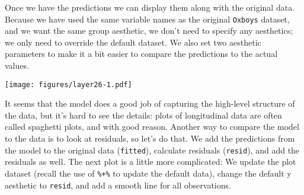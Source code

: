 \begin{Shaded}
\begin{Highlighting}[]
\NormalTok{>}\StringTok{ }\StringTok{ }\NormalTok{(-}\NormalTok{, }\NormalTok{, } \NormalTok{)}
\NormalTok{>}\StringTok{ }\StringTok{ }
\NormalTok{>}\StringTok{ }
\ErrorTok{>}\StringTok{ }\StringTok{ }\NormalTok{(}  
\NormalTok{>}\StringTok{ }\StringTok{ }
\end{Highlighting}
\end{Shaded}

Once we have the predictions we can display them along with the original
data. Because we have used the same variable names as the original
\texttt{Oxboys} dataset, and we want the same group aesthetic, we don't
need to specify any aesthetics; we only need to override the default
dataset. We also set two aesthetic parameters to make it a bit easier to
compare the predictions to the actual values.

\begin{Shaded}
\begin{Highlighting}[]
\NormalTok{>}\StringTok{ }\StringTok{ }\NormalTok{(}  \NormalTok{, } \NormalTok{)}
\end{Highlighting}
\end{Shaded}

\texttt{[image: figures/layer26-1.pdf]}

It seems that the model does a good job of capturing the high-level
structure of the data, but it's hard to see the details: plots of
longitudinal data are often called spaghetti plots, and with good
reason. Another way to compare the model to the data is to look at
residuals, so let's do that. We add the predictions from the model to
the original data (\texttt{fitted}), calculate residuals
(\texttt{resid}), and add the residuals as well. The next plot is a
little more complicated: We update the plot dataset (recall the use of
\texttt{\%+\%} to update the default data), change the default y
aesthetic to \texttt{resid}, and add a smooth line for all observations.

